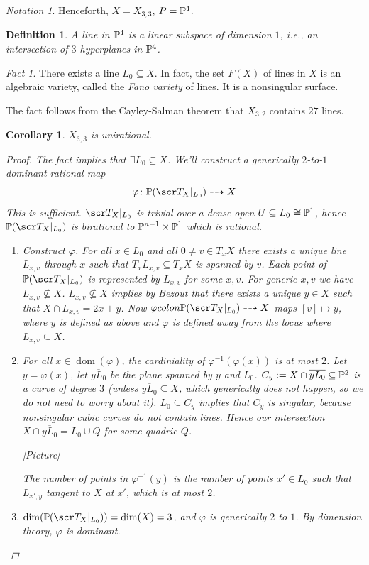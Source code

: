 \documentclass[A4paper, british, reqno]{amsart}
\theoremstyle{darkgreentheorem}
\newtheorem{cor}[thm]{Corollary}
\theoremstyle{darkbluedefinition}
\newtheorem{defn}[thm]{Definition}
\theoremstyle{darkredexample}
\theoremstyle{remark}
\newtheorem{fact}[thm]{Fact}
\newtheorem{nota}[thm]{Notation}
\newcommand{\1}{\mathbbm{1}}
\newcommand{\sub}{\subseteq}
\begin{document}
\begin{nota}
    Henceforth, $X=X_{3,3}$, $P=\P^{4}$.
\end{nota}

\begin{defn}
    A \textit{line} in $\P^{4}$ is a linear subspace of dimension $1$, i.e., an intersection of $3$ hyperplanes in $\P^{4}$.
\end{defn}

\begin{fact}
    There exists a line $L_{0}\sub X$.
    In fact, the set $F(X)$ of lines in $X$ is an algebraic variety, called the \textit{Fano variety} of lines.
    It is a nonsingular surface.
\end{fact}

The fact follows from the Cayley-Salman theorem that $X_{3,2}$ contains $27$ lines.

\begin{cor}
    $X_{3,3}$ is unirational.
    \begin{proof}
	The fact implies that $\exists L_{0}\sub X$.
	We'll construct a generically $2$-to-$1$ dominant rational map
	\[ \varphi\colon \P(\sT_{X}|_{L_{0}})\dashrightarrow X \]
	This is sufficient.
	$\sT_{X}|_{L_{0}}$ is trivial over a dense open $U\sub L_{0}\cong \P^{1}$, hence $\P(\sT_{X}|_{L_{0}})$ is birational to $\P^{n-1}\times \P^{1}$ which is rational.
	\begin{enumerate}[label=Step \arabic*)]
	    \item Construct $\varphi$.
		For all $x\in L_{0}$ and all $0\neq v\in T_{x}X$ there exists a unique line $L_{x,v}$ through $x$ such that $T_{x}L_{x,v}\sub T_{x}X$ is spanned by $v$.
		Each point of $\P(\sT_{X}|_{L_{0}})$ is represented by $L_{x,v}$ for some $x,v$.
		For generic $x,v$ we have $L_{x,v}\not\subseteq X$.
		$L_{x,v}\not\subseteq X$ implies by Bezout that there exists a unique $y\in X$ such that $X\cap L_{x,v}=2x+y$.
		Now $\varphi colon \P(\sT_{X}|_{L_{0}})\dashrightarrow X$ maps $[v]\mapsto y$, where $y$ is defined as above and $\varphi $ is defined away from the locus where $L_{x,v}\sub X$.
	    \item For all $x\in \operatorname{dom}(\varphi)$, the cardiniality of $\varphi^{-1}(\varphi(x))$ is at most $2$.
		Let $y=\varphi(x)$, let $\overline{yL_{0}}$ be the plane spanned by $y$ and $L_{0}$.
		$C_{y}:=X\cap \overline{yL_{0}}\sub \P^{2}$ is a curve of degree $3$ (unless $\overline{yL_{0}}\sub X$, which generically does not happen, so we do not need to worry about it).
		$L_{0}\sub C_{y}$ implies that $C_{y}$ is singular, because nonsingular cubic curves do not contain lines.
		Hence our intersection $X\cap \overline{yL_{0}}=L_{0}\cup Q$ for some quadric $Q$.

		[Picture]

		The number of points in $\varphi^{-1}(y)$ is the number of points $x'\in L_{0}$ such that $L_{x',y}$ tangent to $X$ at $x'$, which is at most $2$.
	    \item $\dim(\P(\sT_{X}|_{L_{0}}))=\dim(X)=3$, and $\varphi$ is generically $2$ to $1$.
		By dimension theory, $\varphi$ is dominant.
	\end{enumerate}
    \end{proof}
\end{cor}
\end{document}
